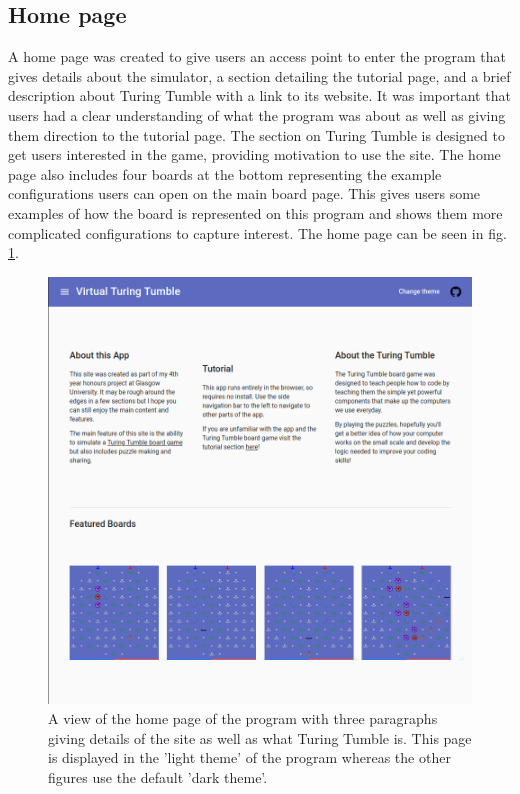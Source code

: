 \documentclass{l4proj}
\begin{document}
\subsection{Home page}
A home page was created to give users an access point to enter the program that gives details about the simulator, a section detailing the tutorial page, and a brief description about Turing Tumble with a link to its website. It was important that users had a clear understanding of what the program was about as well as giving them direction to the tutorial page. The section on Turing Tumble is designed to get users interested in the game, providing motivation to use the site. The home page also includes four boards at the bottom representing the example configurations users can open on the main board page. This gives users some examples of how the board is represented on this program and shows them more complicated configurations to capture interest. The home page can be seen in fig. \ref{fig:homePage}.

\begin{figure}
    \centering
    \includegraphics[width=0.65\linewidth]{images/lightTheme.png}
    \caption{A view of the home page of the program with three paragraphs giving details of the site as well as what Turing Tumble is. This page is displayed in the 'light theme' of the program whereas the other figures use the default 'dark theme'.}
    \label{fig:homePage}
\end{figure}
\end{document}
